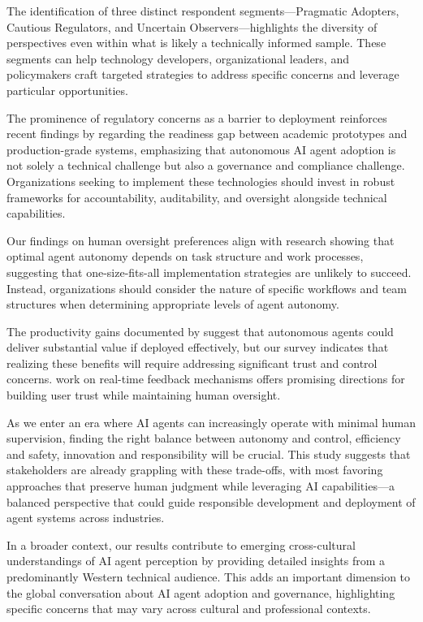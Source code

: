 \documentclass{article}
\begin{document}
The identification of three distinct respondent segments---Pragmatic
Adopters, Cautious Regulators, and Uncertain Observers---highlights the
diversity of perspectives even within what is likely a technically
informed sample. These segments can help technology developers,
organizational leaders, and policymakers craft targeted strategies to
address specific concerns and leverage particular opportunities.

The prominence of regulatory concerns as a barrier to deployment
reinforces recent findings by \cite{Wrona2023} regarding the
readiness gap between academic prototypes and production-grade systems,
emphasizing that autonomous AI agent adoption is not solely a technical
challenge but also a governance and compliance challenge. Organizations
seeking to implement these technologies should invest in robust
frameworks for accountability, auditability, and oversight alongside
technical capabilities.

Our findings on human oversight preferences align with \cite{Hauptman2022} research showing that optimal agent autonomy depends on task
structure and work processes, suggesting that one-size-fits-all
implementation strategies are unlikely to succeed. Instead,
organizations should consider the nature of specific workflows and team
structures when determining appropriate levels of agent autonomy.

The productivity gains documented by \cite{NoyZhang2023} suggest that
autonomous agents could deliver substantial value if deployed
effectively, but our survey indicates that realizing these benefits will
require addressing significant trust and control concerns. \cite{Brown2025} work on real-time feedback mechanisms offers promising
directions for building user trust while maintaining human oversight.

As we enter an era where AI agents can increasingly operate with minimal
human supervision, finding the right balance between autonomy and
control, efficiency and safety, innovation and responsibility will be
crucial. This study suggests that stakeholders are already grappling
with these trade-offs, with most favoring approaches that preserve human
judgment while leveraging AI capabilities---a balanced perspective that
could guide responsible development and deployment of agent systems
across industries.

In a broader context, our results contribute to emerging cross-cultural
understandings of AI agent perception \citep{LiuCHI2024} by providing
detailed insights from a predominantly Western technical audience. This
adds an important dimension to the global conversation about AI agent
adoption and governance, highlighting specific concerns that may vary
across cultural and professional contexts.
\end{document}
